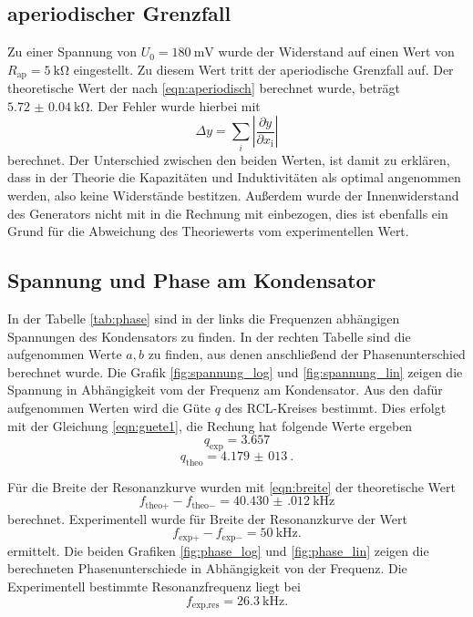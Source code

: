 \FloatBarrier

\subsection{aperiodischer Grenzfall}
Zu einer Spannung von $U_0 = \SI{180}{\milli\V}$ wurde der Widerstand auf einen Wert von $R_\text{ap} = \SI{5}{\kilo\ohm}$ eingestellt.
Zu diesem Wert tritt der aperiodische Grenzfall auf. Der theoretische Wert der nach \eqref{eqn:aperiodisch} berechnet wurde, beträgt $\SI{5.72(4)}{\kilo\ohm}$.
Der Fehler wurde hierbei mit 
\begin{equation}
    \Delta y = \sum_i \left | \frac{\partial y}{\partial x_\text{i}} \right |
    \label{eqn:fehler}
\end{equation}
berechnet.
Der Unterschied zwischen den beiden Werten, ist damit zu erklären, dass in der Theorie die Kapazitäten und Induktivitäten als optimal angenommen werden, also keine Widerstände bestitzen.
Außerdem wurde der Innenwiderstand des Generators nicht mit in die Rechnung mit einbezogen, dies ist ebenfalls ein Grund für die Abweichung des Theoriewerts vom experimentellen Wert.

\FloatBarrier  
\subsection{Spannung und Phase am Kondensator}
In der Tabelle \ref{tab:phase} sind in der links die Frequenzen abhängigen Spannungen des Kondensators zu finden.
In der rechten Tabelle sind die aufgenommen Werte $a, b$ zu finden, aus denen anschließend der Phasenunterschied berechnet wurde.
Die Grafik \ref{fig:spannung_log} und \ref{fig:spannung_lin} zeigen die Spannung in Abhängigkeit vom der Frequenz am Kondensator.
Aus den dafür aufgenommen Werten wird die Güte $q$ des RCL-Kreises bestimmt.
Dies erfolgt mit der Gleichung \eqref{eqn:guete1}, die Rechung hat folgende Werte ergeben
\begin{equation*}
    q_\text{exp} = 3.657
\end{equation*}
\begin{equation*}
    q_\text{theo} =  \SI{4,179(013)}{}.
\end{equation*}

Für die Breite der Resonanzkurve wurden mit \eqref{eqn:breite} der theoretische Wert 
\begin{equation*}
    f_{\text{theo}+}- f_{\text{theo}-} = \SI{40.430(012)}{\kilo\hertz}
\end{equation*}
berechnet.
Experimentell wurde für Breite der Resonanzkurve der Wert 
\begin{equation*}
    f_{\text{exp}+}-f_{\text{exp}-} = \SI{50}{\kilo\hertz}.
\end{equation*}
ermittelt.
Die beiden Grafiken \ref{fig:phase_log} und \ref{fig:phase_lin} zeigen die berechneten Phasenunterschiede in Abhängigkeit von der Frequenz.
Die Experimentell bestimmte Resonanzfrequenz liegt bei 
\begin{equation*}
    f_{\text{exp},\text{res}} = \SI{26.3}{\kilo\hertz}.
\end{equation*}


